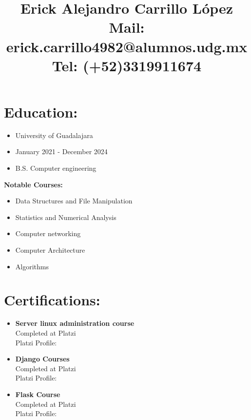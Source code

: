 \documentclass{article}
\title{\textbf{Erick Alejandro Carrillo López} \\
\textbf{Mail:} erick.carrillo4982@alumnos.udg.mx\\
\textbf{Tel:} (+52)3319911674
\quad\quad \href{https://github.com/alecksandr26}{\color{Blue}{Github}}
\quad\quad \href{https://www.linkedin.com/in/erick-alejandro-carrillo-lopez-988112219/}{\color{Blue}{Linkedin}}
}
\date{}
\begin{document}
\maketitle

\begin{minipage}[t]{8cm}
\vspace*{-2cm}
\section*{Education:}
\begin{itemize}
  \setlength\itemsep{0.01cm}
\item University of Guadalajara
\item January 2021 - December 2024
\item B.S. Computer engineering
\end{itemize}
\textbf{Notable Courses:}
\begin{itemize}
  \setlength\itemsep{0.01cm}
\item Data Structures and File Manipulation
\item Statistics and Numerical Analysis
\item Computer networking
\item Computer Architecture
\item Algorithms
\end{itemize}

\section*{Certifications:}
\begin{itemize}
  \setlength\itemsep{0.01cm}
\item \textbf{Server linux administration course}\\
  Completed at Platzi\\
  Platzi Profile: \href{https://platzi.com/p/windowsky/}{\color{Blue}{Platzi}}
\item \textbf{Django Courses}\\
  Completed at Platzi\\
  Platzi Profile: \href{https://platzi.com/p/windowsky/}{\color{Blue}{Platzi}}
\item \textbf{Flask Course}\\
  Completed at Platzi\\
  Platzi Profile: \href{https://platzi.com/p/windowsky/}{\color{Blue}{Platzi}}
  

\end{itemize}
\end{minipage}
\end{document}
